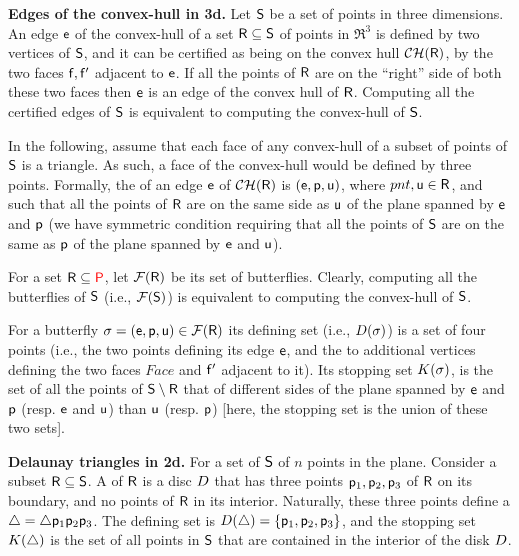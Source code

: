 \begin{compactenumA}
    \smallskip
    \item \textbf{Edges of the convex-hull in 3d.}  Let $\mathsf{S}$ be a
    set of points in three dimensions.  An edge $\mathsf{e}$ of the
    convex-hull of a set $\mathsf{R} \subseteq \mathsf{S}$ of points in
    $\Re^3$ is defined by two vertices of $\mathsf{S}$, and it can be
    certified as being on the convex hull $\CHX{\Sample}$, by the two
    faces $\mathsf{f}, \mathsf{f}'$ adjacent to $\mathsf{e}$. If all the points of
    $\mathsf{R}$ are on the ``right'' side of both these two faces then
    $\mathsf{e}$ is an edge of the convex hull of $\mathsf{R}$.  Computing all
    the certified edges of $\mathsf{S}$ is equivalent to computing the
    convex-hull of $\mathsf{S}$.
    
    In the following, assume that each face of any convex-hull of a
    subset of points of $\mathsf{S}$ is a triangle. As such, a face of
    the convex-hull would be defined by three points.  Formally, the
     of an edge $\mathsf{e}$ of $\CHX{\Sample}$ is
    $(\mathsf{e}, \mathsf{p}, \mathsf{u})$, where $pnt, \mathsf{u} \in \mathsf{R}$, and such
    that all the points of $\mathsf{R}$ are on the same side as $\mathsf{u}$
    of the plane spanned by $\mathsf{e}$ and $\mathsf{p}$ (we have symmetric
    condition requiring that all the points of $\mathsf{S}$ are on the
    same as $\mathsf{p}$ of the plane spanned by $\mathsf{e}$ and $\mathsf{u}$).
    
    For a set $\mathsf{R} \subseteq {{\textcolor{red}{\mathsf{P}}}}$, let $\RegionsSet{\Sample}$
    be its set of butterflies.  Clearly, computing all the butterflies
    of $\mathsf{S}$ (i.e., $\RegionsSet{\ObjSet}$) is equivalent to
    computing the convex-hull of $\mathsf{S}$.
    
    For a butterfly $\Trap = \pth{\Edge, \pnt, \pntA} \in
    \RegionsSet{\Sample}$ its defining set (i.e., $\DefSet{\Trap}$) is
    a set of four points (i.e., the two points defining its edge
    $\mathsf{e}$, and the to additional vertices defining the two faces
    $Face$ and $\mathsf{f}'$ adjacent to it). Its stopping set
    $\KillSet{\Trap}$, is the set of all the points of
    $\mathsf{S}\setminus \mathsf{R}$ that of different sides of the plane
    spanned by $\mathsf{e}$ and $\mathsf{p}$ (resp. $\mathsf{e}$ and $\mathsf{u}$) than
    $\mathsf{u}$ (resp. $\mathsf{p}$) [here, the stopping set is the union of
    these two sets].

    \smallskip%
    \item \textbf{Delaunay triangles in 2d.}  For a set of $\mathsf{S}$
    of $n$ points in the plane. Consider a subset
    $\mathsf{R} \subseteq \mathsf{S}$. A  of $\mathsf{R}$ is a disc $D$ that
    has three points $\mathsf{p}_1, \mathsf{p}_2, \mathsf{p}_3$ of $\mathsf{R}$ on its
    boundary, and no points of $\mathsf{R}$ in its interior. Naturally,
    these three points define a 
    $\triangle = \triangle \mathsf{p}_1 \mathsf{p}_2 \mathsf{p}_3$. The defining set is
    $\DefSet{\triangle} = \brc{\pnt_1, \pnt_2, \pnt_3}$, and the
    stopping set $\KillSet{\triangle}$ is the set of all points in
    $\mathsf{S}$ that are contained in the interior of the disk $D$.
    
\end{compactenumA}

